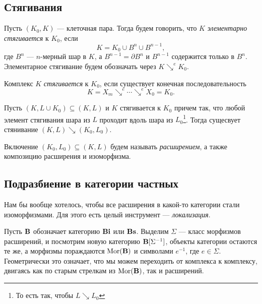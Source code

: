 \documentclass[10pt, twoside]{article}
\begin{document}
\subsection{Стягивания}
\begin{definition}
    Пусть $(K_0, K)$ --- клеточная пара. Тогда будем говорить, что $K$ \emph{элементарно стягивается} к $K_0$, если $$K = K_0 \cup B^n \cup B^{n-1},$$
    где $B^n$ --- $n$-мерный шар в $K$, а $B^{n-1} = \partial B^n$ и $B^{n-1}$ содержится только в $B^n$. Элементарное стягивание будем обозначать через $K \searrow^e K_0.$
\end{definition}
\begin{definition}
    Комплекс $K$ \emph{стягивается} к $K_0$, если существует конечная последовательность \[
        K = X_m \searrow^e \cdots \searrow^e X_0 = K_0.
    \]
\end{definition}
\begin{lemma}
    Пусть $(K, L \cup K_0) \subseteq (K, L)$ и $K$ стягивается к $K_0$ причем так, что любой элемент стягивания шара из $L$ проходит вдоль шара из $L_0$\footnote{То есть так, чтобы $L \searrow L_0$}. Тогда сущесвует стянивание $(K, L) \searrow (K_0, L_0)$.
\end{lemma}

Включение $(K_0, L_0) \subseteq (K, L)$ будем называть \emph{расширением}, а также композицию расширения и изоморфизма.

\subsection{Подразбиение в категории частных}
Нам бы вообще хотелось, чтобы все расширения в какой-то категории стали изоморфизмами. Для этого есть целый инструмент --- \emph{локализация}.

Пусть $\mathbf{B}$ обозначает категорию $\mathbf{Bi}$ или $\mathbf{Bs}$. Выделим $\Sigma$ --- класс морфизмов расширений, и посмотрим новую категорию $\mathbf{B}[\Sigma^{-1}]$, объекты категории остаются те же, а морфизмы пораждаются $\operatorname{Mor}(\mathbf{B})$ и символами $e^{-1}$, где $e \in \Sigma$. Геометрически это означает, что мы можем переходить от комплекса к комплексу, двигаясь как по старым стрелкам из $\operatorname{Mor}(\mathbf{B})$, так и  расширений.
\end{document}
